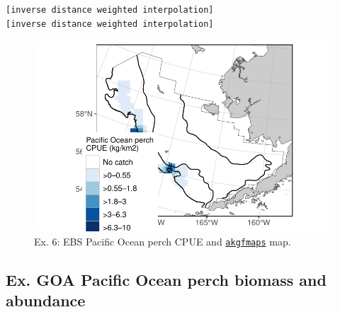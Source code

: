 \documentclass[
  letterpaper,
  oneside,
  open=any]{scrbook}
\newenvironment{Shaded}{\begin{snugshade}}{\end{snugshade}}
\newcommand{\AttributeTok}[1]{\textcolor[rgb]{0.40,0.45,0.13}{#1}}
\newcommand{\ConstantTok}[1]{\textcolor[rgb]{0.56,0.35,0.01}{#1}}
\newcommand{\FunctionTok}[1]{\textcolor[rgb]{0.28,0.35,0.67}{#1}}
\newcommand{\NormalTok}[1]{\textcolor[rgb]{0.00,0.23,0.31}{#1}}
\newcommand{\SpecialCharTok}[1]{\textcolor[rgb]{0.37,0.37,0.37}{#1}}
\newcommand{\StringTok}[1]{\textcolor[rgb]{0.13,0.47,0.30}{#1}}
\begin{document}
\begin{verbatim}
[inverse distance weighted interpolation]
[inverse distance weighted interpolation]
\end{verbatim}

\begin{Shaded}
\end{Shaded}

\begin{figure}[H]

{\centering \includegraphics{content/akfin-oracle-sql-r_files/figure-pdf/test-6-fig-1.pdf}

}

\caption{Ex. 6: EBS Pacific Ocean perch CPUE and
\href{https://github.com/afsc-gap-products/akgfmaps}{\texttt{akgfmaps}}
map.}

\end{figure}

\hypertarget{ex.-goa-pacific-ocean-perch-biomass-and-abundance}{%
\subsection{Ex. GOA Pacific Ocean perch biomass and
abundance}\label{ex.-goa-pacific-ocean-perch-biomass-and-abundance}}
\end{document}
